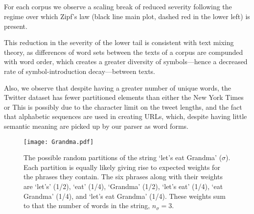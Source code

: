 



\\
 \\
\\
\\


For each corpus we observe a scaling
break of reduced severity following the regime over which Zipf's
law (black line main plot, dashed red in the lower left) is
present. 


This reduction in the severity of the lower tail is
consistent with text mixing theory, as differences of word sets
between the texts of a corpus are compunded with word order, which
creates a greater diversity of symbols---hence a decreased rate of
symbol-introduction decay---between texts. 

Also, we observe that
despite having a greater number of unique words, the Twitter
dataset has fewer partitioned elements than either the New York
Times or 
This is possibly due to the
character limit on the tweet lengths, and the fact that alphabetic
sequences are used in creating URLs, which, despite having little
semantic
meaning are picked up by our parser as word forms.


\begin{figure}[tbp!]
  \centering
  \texttt{[image: Grandma.pdf]}
  \caption{
    The possible random partitions of the string `let's eat
    Grandma' ($\sigma$).
    Each partition is equally likely giving rise
    to expected weights for the phrases they contain.
    The six phrases along with their weights are
    `let's' (1/2),
    `eat' (1/4),
    `Grandma' (1/2),
    `let's eat' (1/4),
    `eat Grandma' (1/4),
    and 
    `let's eat Grandma' (1/4).
    These weights sum to that the number of words 
    in the string, $n_\sigma=3$.
  }
  \label{fig:textpart.grandma}
\end{figure}


